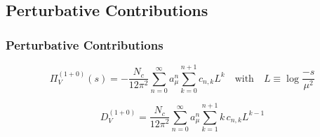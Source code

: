 \documentclass[fleqn]{beamer}
\begin{document}
\subsection{Perturbative Contributions}
\begin{frame}
  \frametitle{Perturbative Contributions}
  \begin{equation}
    \Pi_V^{(1+0)}(s) = - \frac{N_c}{12 \pi^2} \sum_{n=0}^\infty a_\mu^n \sum_{k=0}^{n+1} c_{n,k} L^k
    \quad \text{with} \quad L \equiv \log \frac{-s}{\mu^2}
  \end{equation}

  \begin{equation}
    D_V^{(1+0)} = \frac{N_c}{12 \pi^2} \sum_{n=0}^\infty a_\mu^n \sum_{k=1}^{n+1} k\, c_{n,k} L^{k-1}
  \end{equation}

\end{frame}
\end{document}
